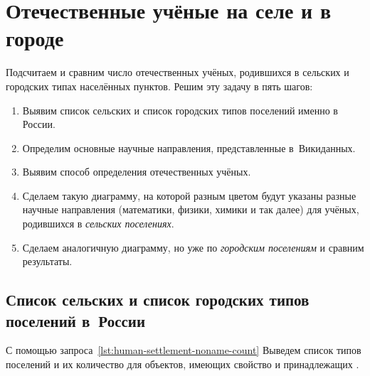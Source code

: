 \newpage

\section{Отечественные учёные на селе и в городе}

Подсчитаем и сравним число отечественных учёных, родившихся в сельских и городских типах населённых пунктов. 
Решим эту задачу в пять шагов:
\begin{enumerate}
  \item Выявим список сельских и список городских типов поселений именно в России.
  \item Определим основные научные направления, представленные в~Викиданных.
  \item Выявим способ определения отечественных учёных.
  \item Сделаем такую диаграмму, на которой разным цветом будут указаны разные научные направления (математики, физики, химики и так далее) для учёных, родившихся в \emph{сельских поселениях}.
  \item Сделаем аналогичную диаграмму, но уже по \emph{городским поселениям} и сравним результаты.
\end{enumerate}


\subsection{Список сельских и список городских типов поселений в~России}%
\label{sec:list-village-city-types-in-Russia}

С помощью запроса~\ref{lst:human-settlement-noname-count} 
Выведем список типов поселений и их количество для объектов, 
имеющих свойство  
и принадлежащих . 


